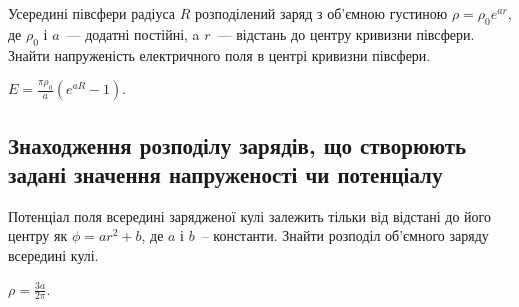 \begin{problem}
    Усередині півсфери радіуса $R$ розподілений заряд з об'ємною густиною $\rho = \rho_0e^{ar}$, де $\rho_0$ і $a$~--- додатні постійні, a $r$~--- відстань до центру кривизни півсфери. Знайти напруженість електричного поля в центрі кривизни півсфери.
\begin{solution}
	$E = \frac{\pi\rho_0}{a}(e^{aR} - 1)$.
\end{solution}
\end{problem}


\subsection*{Знаходження розподілу зарядів, що створюють задані значення напруженості чи потенціалу}

\begin{problem}
Потенціал поля всередині зарядженої кулі залежить тільки від відстані до його центру як $\phi = ar^2 + b$, де $a$ і $b$~-- 	константи. Знайти розподіл об'ємного заряду всередині кулі.
\begin{solution}
	$\rho = \frac{3a}{2\pi}$.
\end{solution}
\end{problem}

